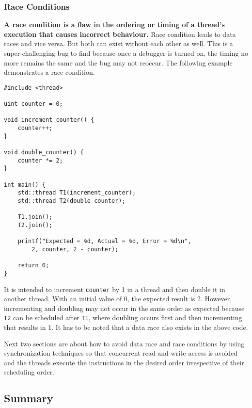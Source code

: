 \documentclass{scrartcl}
\begin{document}
\subsubsection{Race Conditions}
\textbf{A race condition is a flaw in the ordering or timing of a thread's execution that causes incorrect behaviour.} Race condition leads to data races and vice versa. But both can exist without each other as well. This is a super-challenging bug to find because once a debugger is turned on, the timing no more remains the same and the bug may not reoccur. The following example demonstrates a race condition.

\begin{verbatim}
#include <thread>

uint counter = 0;

void increment_counter() {
    counter++;
}

void double_counter() {
    counter *= 2;
}

int main() {
    std::thread T1(increment_counter);
    std::thread T2(double_counter);

    T1.join();
    T2.join();

    printf("Expected = %d, Actual = %d, Error = %d\n", 
        2, counter, 2 - counter);

    return 0;
}
\end{verbatim}

It is intended to increment \texttt{counter} by 1 in a thread and then double it in another thread. With an initial value of 0, the expected result is 2. However, incrementing and doubling may not occur in the same order as expected because \texttt{T2} can be scheduled after \texttt{T1}, where doubling occurs first and then incrementing that results in 1. It has to be noted that a data race also exists in the above code. 

Next two sections are about how to avoid data race and race conditions by using synchronization techniques so that concurrent read and write access is avoided and the threads execute the instructions in the desired order irrespective of their scheduling order.

\subsection{Summary}
\end{document}

